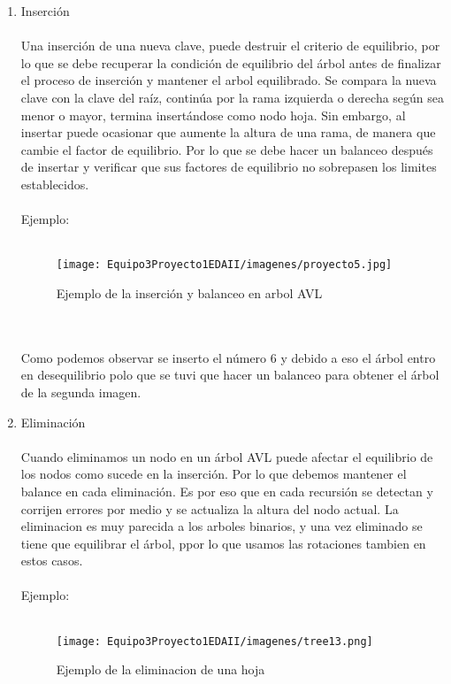 \documentclass{report}
\begin{document}
\begin{enumerate}
    \item Inserción\\\\
    Una inserción de una nueva clave, puede destruir el criterio de equilibrio, por lo que se debe recuperar la condición de equilibrio del árbol antes de finalizar el proceso de inserción y mantener el arbol equilibrado.
    Se compara la
nueva clave con la clave del raíz, continúa por la rama izquierda o derecha según sea menor o
mayor, termina insertándose como nodo hoja. Sin embargo, al insertar puede ocasionar que aumente la altura de una rama,
de manera que cambie el factor de equilibrio. Por lo que se debe hacer un balanceo después de insertar y verificar que sus factores de equilibrio no sobrepasen los limites establecidos.\\\\
Ejemplo:\\\\
\begin{figure}[h]
        \centering
        \texttt{[image: Equipo3Proyecto1EDAII/imagenes/proyecto5.jpg]}
        \caption{Ejemplo de la inserción y balanceo en arbol AVL}
        \label{fig:my_label}
    \end{figure}
    \\\\
    Como podemos observar se inserto el número 6 y debido a eso el árbol entro en desequilibrio polo que se tuvi que hacer un balanceo para obtener el árbol de la segunda imagen.
    \item Eliminación\\\\
    Cuando eliminamos un nodo en un árbol AVL puede afectar el equilibrio de los nodos como sucede en la inserción. Por lo que debemos mantener el balance en cada eliminación.
    Es por eso que en cada recursión se detectan y corrijen errores por medio y se actualiza la altura del nodo actual.
    La eliminacion es muy parecida a los arboles binarios, y una vez eliminado se tiene que equilibrar el árbol, ppor lo que usamos las rotaciones tambien en estos casos.\\\\
    Ejemplo:\\\\
    \begin{figure}[h]
        \centering
        \texttt{[image: Equipo3Proyecto1EDAII/imagenes/tree13.png]}
        \caption{Ejemplo de la eliminacion de una hoja}
        \label{fig:my_label}
    \end{figure}
\end{enumerate}
\end{document}
